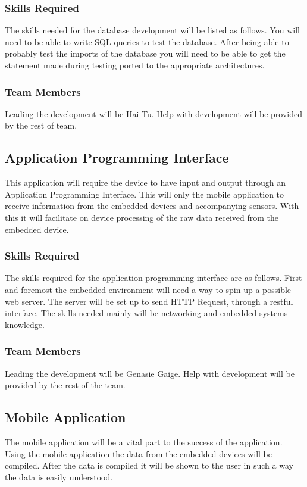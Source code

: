 \documentclass{article}
\begin{document}
\subsubsection{Skills Required}
The skills needed for the database development will be listed as follows.
You will need to be able to write SQL queries to test the database.
After being able to probably test the imports of the database you will need to be able to get the statement made during testing ported to the appropriate architectures.

\subsubsection{Team Members}
Leading the development will be Hai Tu.
Help with development will be provided by the rest of team.




\subsection{Application Programming Interface}

This application will require the device to have input and output through an Application Programming Interface.
This will only the mobile application to receive information from the embedded devices and accompanying sensors.
With this it will facilitate on device processing of the raw data received from the embedded device.

\subsubsection{Skills Required}

The skills required for the application programming interface are as follows. 
First and foremost the embedded environment will need a way to spin up a possible web server. 
The server will be set up to send HTTP Request, through a restful interface.
The skills needed mainly will be networking and embedded systems knowledge.

\subsubsection{Team Members}
Leading the development will be Genasie Gaige.
Help with development will be provided by the rest of the team.

\subsection{Mobile Application}
The mobile application will be a vital part to the success of the application.
Using the mobile application the data from the embedded devices will be compiled.
After the data is compiled it will be shown to the user in such a way the data is easily understood.
\end{document}
